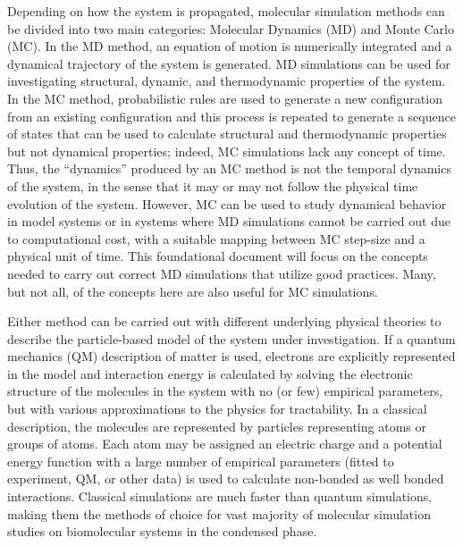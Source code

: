 \documentclass[9pt,bestpractices]{livecoms}
\begin{document}
Depending on how the system is propagated, molecular simulation methods can be
divided into two main categories: Molecular Dynamics (MD) and Monte Carlo (MC).
In the MD method, an equation of motion is numerically integrated and a
dynamical trajectory of the system is generated.  MD simulations can be used for
investigating structural, dynamic, and thermodynamic properties of the system.
In the MC method, probabilistic rules are used to generate a new configuration
from an existing configuration and this process is repeated to generate a
sequence of states that can be used to calculate structural and thermodynamic
properties but not dynamical properties; indeed, MC simulations lack any concept
of time.  Thus, the ``dynamics'' produced by an MC method is not the temporal
dynamics of the system, in the sense that it may or may not follow the physical
time evolution of the system.  However, MC can be used to study dynamical
behavior in model systems or in systems where MD simulations cannot be carried
out due to computational cost, with a suitable mapping between MC step-size and
a physical unit of time.  This foundational document will focus on the concepts
needed to carry out correct MD simulations that utilize good practices.  Many, but not all, of the
concepts here are also useful for MC simulations.

Either method can be carried out with different underlying physical theories to
describe the particle-based model of the system under investigation.  If a
quantum mechanics (QM) description of matter is used, electrons are explicitly
represented in the model and interaction energy is calculated by solving the
electronic structure of the molecules in the system with no (or few) empirical
parameters, but with various approximations to the physics for tractability.  In
a classical description, the molecules are represented by particles representing
atoms or groups of atoms.  Each atom may be assigned an electric charge and a
potential energy function with a large number of empirical parameters (fitted to
experiment, QM, or other data)  is used to calculate non-bonded as well bonded
interactions. Classical simulations are much faster than quantum simulations,
making them the methods of choice for vast majority of molecular simulation
studies on biomolecular systems in the condensed phase. 
\end{document}
